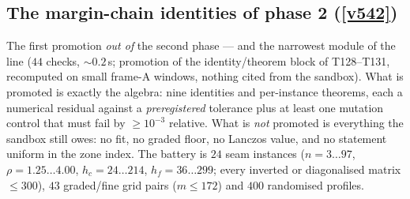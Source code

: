 \documentclass[11pt,a4paper]{article}
\begin{document}
\subsection{The margin-chain identities of phase 2 (\texorpdfstring{\vref{v542}}{v542})}\label{sec:v542}
The first promotion \emph{out of} the second phase --- and the narrowest module of the line
 ($44$ checks, ${\sim}0.2$\,s; promotion of the
identity/theorem block of T128--T131, recomputed on small frame-A windows, nothing cited from the
sandbox). What is promoted is exactly the algebra: nine identities and per-instance theorems, each a
numerical residual against a \emph{preregistered} tolerance plus at least one mutation control that
must fail by $\ge10^{-3}$ relative. What is \emph{not} promoted is everything the sandbox still owes:
no fit, no graded floor, no Lanczos value, and no statement uniform in the zone index. The battery is
$24$ seam instances ($n=3\ldots97$, $\rho=1.25\ldots4.00$, $h_c=24\ldots214$, $h_f=36\ldots299$;
every inverted or diagonalised matrix $\le300$), $43$ graded/fine grid pairs ($m\le172$) and $400$
randomised profiles.
\end{document}
